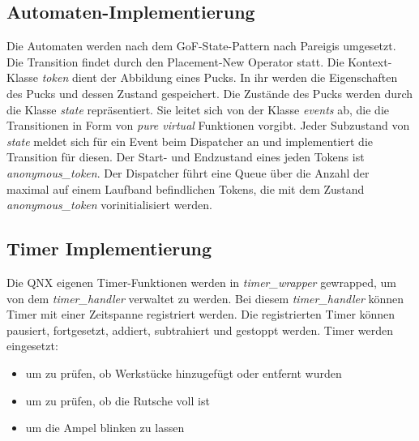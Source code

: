 \documentclass[oneside,a4paper,titlepage]{scrartcl} %
\begin{document}
\subsection{Automaten-Implementierung}
Die Automaten werden nach dem GoF-State-Pattern nach Pareigis umgesetzt. Die Transition findet durch den
Placement-New Operator statt. Die Kontext-Klasse \emph{token} dient der Abbildung eines Pucks. In ihr werden die
Eigenschaften des Pucks und dessen Zustand gespeichert.\newline
Die Zustände des Pucks werden durch die Klasse \emph{state} repräsentiert. Sie leitet sich von der Klasse
\emph{events} ab, die die Transitionen in Form von \emph{pure virtual} Funktionen vorgibt.\newline
Jeder Subzustand von \emph{state} meldet sich für ein Event beim Dispatcher an und implementiert die Transition
für diesen.\newline
Der Start- und Endzustand eines jeden Tokens ist \emph{anonymous\_token}.\newline
Der Dispatcher führt eine Queue über die Anzahl der maximal auf einem Laufband befindlichen Tokens, die mit dem Zustand
\emph{anonymous\_token} vorinitialisiert werden.

\subsection{Timer Implementierung}
Die QNX eigenen Timer-Funktionen werden in \emph{timer\_wrapper} gewrapped, um von dem \emph{timer\_handler} verwaltet zu werden. Bei diesem \emph{timer\_handler} können Timer mit einer Zeitspanne registriert werden.
Die registrierten Timer können pausiert, fortgesetzt, addiert, subtrahiert und gestoppt werden.\newline
Timer werden eingesetzt:
\begin{itemize}
    \item um zu prüfen, ob Werkstücke hinzugefügt oder entfernt wurden
    \item um zu prüfen, ob die Rutsche voll ist
    \item um die Ampel blinken zu lassen
\end{itemize}

\newpage
\end{document}
